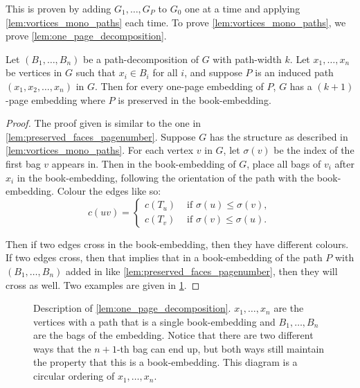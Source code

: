 This is proven by adding $G_1, \ldots, G_P$ to $G_0$ one at a time and applying \cref{lem:vortices_mono_paths} each time. To prove \cref{lem:vortices_mono_paths}, we prove \cref{lem:one_page_decomposition}.
\begin{lemma}\label{lem:one_page_decomposition}
	Let \((B_1, \ldots, B_n)\) be a path-decomposition of \(G\) with path-width \(k\). Let \(x_1, \ldots, x_n\) be vertices in \(G\) such that \(x_i \in B_i\) for all \(i\), and suppose \(P\) is an induced path \((x_1, x_2, \ldots, x_n)\) in \(G\). Then for every one-page embedding of \(P\), \(G\) has a \((k + 1)\)-page embedding where $P$ is preserved in the book-embedding.
\end{lemma}
\begin{proof}
	The proof given is similar to the one in \cref{lem:preserved_faces_pagenumber}. 
	Suppose \(G\) has the structure as described in \cref{lem:vortices_mono_paths}. For each vertex \(v\) in \(G\), let \(\sigma(v)\) be the index of the first bag \(v\) appears in. Then in the book-embedding of \(G\), place all bags of \(v_i\) after \(x_i\) in the book-embedding, following the orientation of the path with the book-embedding. Colour the edges like so:
	\begin{equation}
		c(uv) =
		\begin{cases}
			c(T_u) & \text{ if } \sigma(u) \leq \sigma(v), \\
			c(T_v) & \text{ if } \sigma(v) \leq \sigma(u).
		\end{cases}
	\end{equation}

	Then if two edges cross in the book-embedding, then they have different colours. If two edges cross, then that implies that in a book-embedding of the path \(P\) with \((B_1, \ldots, B_n)\) added in like \cref{lem:preserved_faces_pagenumber}, then they will cross as well. Two examples are given in \cref{fig:preserving_pages}.
\end{proof}

\begin{figure}[h!]
	\centering
	
	\caption[One-page decomposition]{Description of \cref{lem:one_page_decomposition}. \(x_1, \ldots, x_n\) are the vertices with a path that is a single book-embedding and \(B_1, \ldots, B_n\) are the bags of the embedding. Notice that there are two different ways that the \(n + 1\)-th bag can end up, but both ways still maintain the property that this is a book-embedding. This diagram is a circular ordering of \(x_1, \ldots, x_n\).}\label{fig:preserving_pages}
\end{figure}

